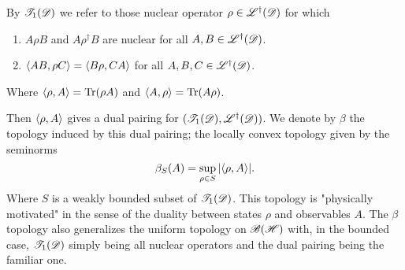 \documentclass[../main.tex]{subfiles}
\begin{document}
\begin{definition}
	
By $\mathscr{T}_1(\mathscr{D})$ we refer to those nuclear operator $\rho \in \mathscr{L}^\dagger(\mathscr{\mathscr{D}})$ for which
\begin{enumerate}
	\item $A\rho B$ and $A \rho^\dagger B$ are nuclear for all $A, B \in \mathscr{L}^\dagger(\mathscr{\mathscr{D}})$.
	\item $\langle AB, \rho C \rangle = \langle B\rho, CA \rangle$ for all $A, B, C \in \mathscr{L}^\dagger(\mathscr{\mathscr{D}})$.
\end{enumerate}
Where $\langle \rho, A \rangle = \text{Tr}(\rho A)$ and $\langle A, \rho \rangle = \text{Tr}(A\rho)$.

\end{definition}

Then $\langle \rho, A \rangle$ gives a dual pairing for $(\mathscr{T}_1(\mathscr{D}), \mathscr{L}^\dagger(\mathscr{\mathscr{D}}))$. We denote by $\beta$ the topology 
induced by this dual pairing; the locally convex topology given by the seminorms \[\beta_S(A) = \sup_{\rho \in S} |\langle \rho, A \rangle|.\]
Where $S$ is a weakly bounded subset of $\mathscr{T}_1(\mathscr{D})$. This topology is "physically motivated" in the sense of the duality between
states $\rho$ and observables $A$. The $\beta$ topology also generalizes the uniform topology on $\mathscr{B}(\mathscr{H})$ with, in the bounded case, $\mathscr{T}_1(\mathscr{D})$
simply being all nuclear operators and the dual pairing being the familiar one.
\end{document}
